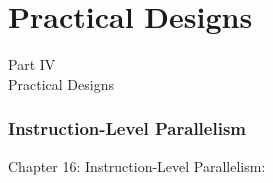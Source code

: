 \documentclass[aspectratio=169,11pt]{beamer}
\begin{document}

% 

\part{Practical Designs}

\begin{frame}
\begin{center}
{\Huge Part IV}\\[0.5cm]
{\Large Practical Designs}\\[0.5cm]
\end{center}
\end{frame}


\section{Instruction-Level Parallelism}

\begin{frame}
\begin{center}
{\Huge Chapter 16: Instruction-Level Parallelism:}\\[0.5cm]
\end{center}
\end{frame}



\end{document}

